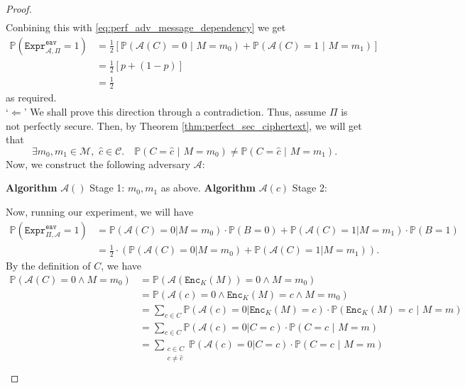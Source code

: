 \documentclass{article}
\theoremstyle{definition}
\theoremstyle{example}
\newcommand{\Enc}{\texttt{Enc}}
\newcommand{\M}{\mathcal{M}}
\renewcommand{\C}{\mathcal{C}}
\newcommand{\A}{\mathcal{A}}
\newcommand{\Prob}{\mathbb{P}}
\newcommand{\Expr}[2]{\texttt{Expr}^{\texttt{#1}}_{#2}}
\begin{document}
\begin{proof}
\begin{gather*}
  \end{gather*}
  Conbining this with \ref{eq:perf_adv_message_dependency} we get
  \begin{align*}
    \Prob(\Expr{eav}{\A, \Pi} = 1) &= \frac12 \left[ \Prob(\A(C) = 0 \,\,|\,\, M = m_0) + \Prob(\A(C) = 1 \,\,|\,\, M = m_1) \right]\\
                                   &= \frac12 [p + (1 - p)] \\
                                   &= \frac12
  \end{align*}
  as required.\\
  `$\Leftarrow$' We shall prove this direction through a contradiction. Thus,
  assume $\Pi$ is not perfectly secure. Then, by Theorem
  \ref{thm:perfect_sec_ciphertext}, we will get that
  \[
    \exists m_0, m_1 \in \M,\,\, \hat{c} \in \C.\quad \Prob(C =
    \hat{c}\,\,|\,\,M = m_0) \neq \Prob(C =
    \hat{c}\,\,|\,\,M = m_1).
  \]
  Now, we construct the following adversary $\A$:\\
  \begin{algorithmic}
    \State \textbf{Algorithm} $\A()$ Stage 1:
    \State \Return $m_0, m_1$ as above.
    \State
    \State \textbf{Algorithm} $\A(c)$ Stage 2:
    \EndIf
    \State
  \end{algorithmic}
  Now, running our experiment, we will have
  \begin{align*}
    \Prob(\Expr{eav}{\Pi, \A} = 1) &= \Prob(\A(C) = 0 | M = m_0)\cdot\Prob(B = 0) + \Prob(\A(C) = 1 | M = m_1)\cdot\Prob(B = 1)\\
                                   &= \frac12 \cdot (\Prob(\A(C) = 0 | M = m_0) + \Prob(\A(C) = 1 | M = m_1)).
  \end{align*}
  By the definition of $C$, we have
  \begin{align*}
    \Prob(\A(C) = 0 \land M = m_0) &= \Prob(\A(\Enc_K(M)) = 0 \land M = m_0)\\
                                   &= \Prob(\A(c) = 0 \land \Enc_K(M) = c \land M = m_0) \\
                                   &= \sum_{c\in C} \Prob(\A(c) = 0 | \Enc_K(M) = c)\cdot \Prob(\Enc_K(M) =c\,\,|\,\, M = m)\\
                                   &=\sum_{c\in C} \Prob(\A(c) = 0 | C = c)\cdot \Prob(C = c\,\,|\,\, M = m) \\
                                   &=\sum_{\substack{c\in C \\ c \neq \hat{c}}} \Prob(\A(c) = 0 | C = c) \cdot \Prob(C = c\,\,|\,\, M = m) \\

\end{align*}
\end{proof}
\end{document}
